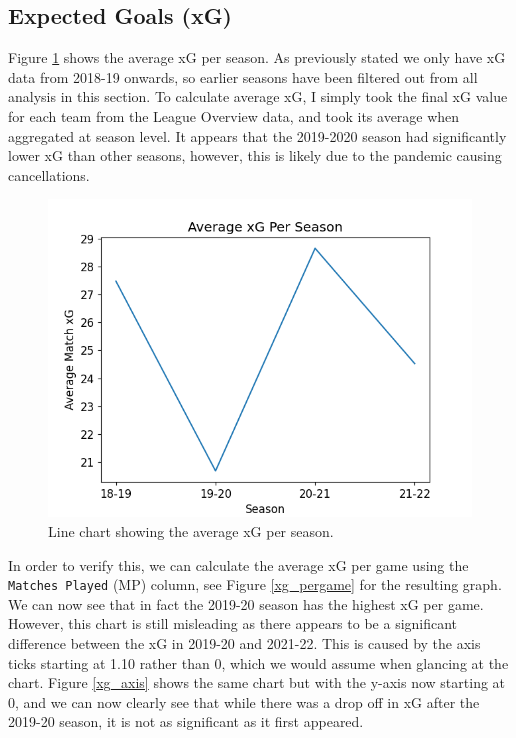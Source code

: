\documentclass[12pt, a4paper, twocolumn]{article}
\begin{document}
\subsection{Expected Goals (xG)}

Figure \ref{xg} shows the average xG per season. As previously stated we only have xG data from 2018-19 onwards, so earlier seasons have been filtered out from all analysis in this section. To calculate average xG, I simply took the final xG value for each team from the League Overview data, and took its average when aggregated at season level. It appears that the 2019-2020 season had significantly lower xG than other seasons, however, this is likely due to the pandemic causing cancellations.

\begin{figure}
  \includegraphics[width=\linewidth]{../vis/tables/average_xg.png}
  \caption{Line chart showing the average xG per season.}
  \label{xg}
\end{figure}

In order to verify this, we can calculate the average xG per game using the \verb|Matches Played| (MP) column, see Figure \ref{xg_pergame} for the resulting graph. We can now see that in fact the 2019-20 season has the highest xG per game. However, this chart is still misleading as there appears to be a significant difference between the xG in 2019-20 and 2021-22. This is caused by the axis ticks starting at 1.10 rather than 0, which we would assume when glancing at the chart. Figure \ref{xg_axis} shows the same chart but with the y-axis now starting at 0, and we can now clearly see that while there was a drop off in xG after the 2019-20 season, it is not as significant as it first appeared.
\end{document}
